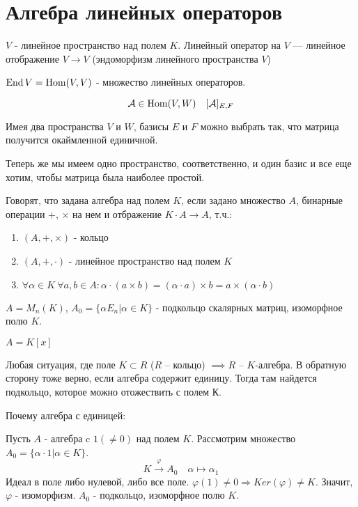 \documentclass[main]{subfiles}
\begin{document}
\chapter{Алгебра линейных операторов}
\begin{definition} 
$V$ - линейное пространство над полем $K$. 
Линейный оператор на $V$ — линейное отображение $V \to V$ (эндоморфизм линейного пространства $V$)
\end{definition}
\begin{definition} 
$\operatorname{End} V = \operatorname{Hom}(V, V)$ - множество линейных операторов.
\end{definition}

\[\mathcal{A} \in \operatorname{Hom} (V, W) \quad [\mathcal{A}]_{E,F}\]

Имея два пространства $V$ и $W$, базисы $E$ и $F$ можно выбрать так, что матрица получится окаймленной единичной.

Теперь же мы имеем одно пространство, соответственно, и один базис и все еще хотим, чтобы матрица была наиболее простой. 

\begin{definition} 
    Говорят, что задана алгебра над полем $K$, если задано множество $A$, бинарные операции +, $\times$ на нем и отбражение $K \cdot A \to A$, т.ч.:
    \begin{enumerate}
        \item $(A,+, \times)$ - кольцо 
        \item $(A,+, \cdot)$ - линейное пространство над полем $K$
        \item $\forall \alpha \in K \  \forall a, b \in A : \alpha \cdot (a \times b) = (\alpha \cdot a) \times b = a \times (\alpha \cdot b)$
    \end{enumerate}
\end{definition}

\begin{example}
    $A = M_n(K)$, 
    $A_0 = \{ \alpha E_n | \alpha \in K\}$ - подкольцо скалярных матриц, изоморфное полю $K$.
\end{example}

\begin{example}
    $A = K[x]$
\end{example}   
\begin{example}
    Любая ситуация, где поле $K \subset R$ ($R$ -- кольцо) $\implies R$ -- $K$-алгебра. 
    В обратную сторону тоже верно, если алгебра содержит единицу. Тогда там найдется подкольцо, которое можно отожествить с полем $К$.
    
    Почему алгебра с единицей: 

    Пусть $A$ - алгебра c $1(\neq0)$ над полем $K$.
    Рассмотрим множество $A_0 = \{\alpha \cdot 1| \alpha \in K\}$. 
    $$K \xrightarrow{\varphi} A_0 \quad \alpha \mapsto \alpha_1$$
    Идеал в поле либо нулевой, либо все поле. 
    $\varphi(1) \neq 0 \Rightarrow Ker(\varphi)\neq K$. 
    Значит,  $\varphi$ - изоморфизм. $A_0$ - подкольцо, изоморфное полю $K$.
\end{example}
\end{document}
